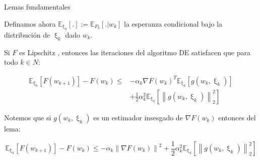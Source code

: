 \documentclass{beamer}
\newcommand{\norm}[1]{\left\lVert#1\right\rVert}
\newcommand{\expectationsub}[2]{\mathbb{E}_{#1} \left[#2\right]}
\begin{document}
\begin{frame}{Lemas fundamentales}

Definamos ahora $\expectationsub{\upxi_k}{.} := \mathbb{E}_{P_k}\left[. \vert w_k\right]$ la esperanza condicional bajo la distribuci\'on de $\upxi_k$ dado $w_k$.

\medskip


\begin{lemma}
	\label{lemma: Fundamental estocasticos 1}
	Si $F$ es Lipschitz , entonces las iteraciones del algoritmo DE satisfacen que para todo $k \in N$:
	
	\begin{equation*}
	\begin{aligned}
	\expectationsub{\upxi_{k}}{F(w_{k+1})} - F(w_k) \leq & - \alpha_k \nabla F(w_k) ^T \expectationsub{\upxi_{k}}{g(w_k, \upxi_{k})} \\ & + \frac{1}{2} \alpha_k^2 \expectationsub{\upxi_{k}}{\norm{g(w_k, \upxi_{k})}^2_2}
	\end{aligned}
	\end{equation*}
	
\end{lemma}
\pause
\medskip

	Notemos que si $g(w_k, \upxi_{k})$ es un estimador insesgado de $\nabla F (w_k)$ entonces del lema:
	
	\begin{equation*}
	\expectationsub{\upxi_{k}}{F(w_{k+1})} - F(w_k) \leq - \alpha_k \norm{\nabla F(w_k)}^2 + \frac{1}{2} \alpha_k^2 \expectationsub{\upxi_{k}}{\norm{g(w_k, \upxi_{k})}^2_2}
	\end{equation*}
	

\end{frame}
\end{document}
